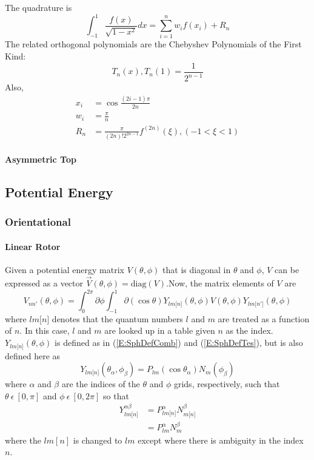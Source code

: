 \documentclass{revtex4-1}
\begin{document}
The quadrature is
\begin{equation}
\int_{-1}^{1}\frac{f(x)}{\sqrt{1-x^{2}}}dx = \sum_{i=1}^{n}w_{i}f(x_{i}) + R_{n}
\end{equation}
The related orthogonal polynomials are the Chebyshev Polynomials of the First Kind:
\begin{equation}
T_{n}(x),T_{n}(1)=\frac{1}{2^{n-1}}
\end{equation}
Also,
\begin{align}
x_{i} &= \cos{\frac{(2i-1)\pi}{2n}}\\
w_{i} &= \frac{\pi}{n}\\
R_{n} &= \frac{\pi}{(2n)!2^{2n-1}}f^{(2n)}(\xi), (-1<\xi<1)
\end{align}
												  
												  
\paragraph{Asymmetric Top}\label{S:AsRotBS} 

\subsection{Potential Energy}\label{S:PE}
\subsubsection{Orientational}\label{S:PEOri}
\paragraph{Linear Rotor}\label{S:PEOriLinRot}
Given a potential energy matrix $V(\theta,\phi)$ that is diagonal in $\theta$ and $\phi$, $V$ can be expressed as a vector $\vec{V}(\theta,\phi) = \mbox{diag}(V)$.Now, the matrix elements of $V$ are
\begin{equation}
V_{nn'}\left(\theta,\phi\right) = \int_{0}^{2\pi}\partial\phi\int_{-1}^{1}\partial\!\left(\cos{\theta}\right)Y_{lm\lbrack n\rbrack}\!\left(\theta,\phi\right)V\!\left(\theta,\phi\right)Y_{lm\lbrack n'\rbrack}\!\left(\theta,\phi\right)
\end{equation}
where $lm\lbrack n\rbrack$ denotes that the quantum numbers $l$ and $m$ are treated as a function of $n$. In this case, $l$ and $m$ are looked up in a table given $n$ as the index. $Y_{lm\lbrack n\rbrack}\!\left(\theta,\phi\right)$ is defined as in (\ref{E:SphDefComb}) and (\ref{E:SphDefTes}), but is also defined here as
\begin{equation}
Y_{lm\lbrack n\rbrack}(\theta_{\alpha},\phi_{\beta}) = P_{lm}(\cos{\theta_{\alpha}})N_{m}(\phi_{\beta})
\end{equation}
where $\alpha$ and $\beta$ are the indices of the $\theta$ and $\phi$ grids, respectively, such that $\theta\ \epsilon\ [0,\pi]$ and $\phi\ \epsilon\ [0, 2\pi]$ so that
\begin{align}
Y_{lm\lbrack n\rbrack}^{\alpha\beta} &= P_{lm\lbrack n\rbrack}^{\alpha}N_{m\lbrack n\rbrack}^{\beta}\\
									&= P_{lm}^{\alpha}N_{m}^{\beta}
\end{align}
where the $lm[n]$ is changed to $lm$ except where there is ambiguity in the index $n$.
\end{document}
